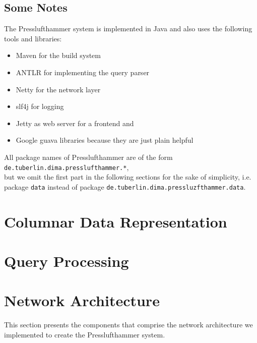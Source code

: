 \subsection{Some Notes}
The Presslufthammer system is implemented in Java and also uses the
following tools and libraries:

\begin{itemize}
  \item Maven \cite{maven} for the build system
  \item ANTLR \cite{antlr} for implementing the query parser
  \item Netty \cite{netty} for the network layer
  \item slf4j \cite{slf4j} for logging
  \item Jetty \cite{jetty} as web server for a frontend and
  \item Google guava libraries \cite{guava} because they are just plain helpful
\end{itemize}

All package names of Presslufthammer are of the form\\
\texttt{de.tuberlin.dima.presslufthammer.*},\\
but we omit the first part in the following sections for the sake of simplicity,
i.e. package \texttt{data} instead of package
\texttt{de.tuberlin.dima.pressluzfthammer.data}.


\section{Columnar Data Representation}

\section{Query Processing}

\section{Network Architecture}
  This section presents the components that comprise the network architecture
  we implemented to create the Presslufthammer system.

